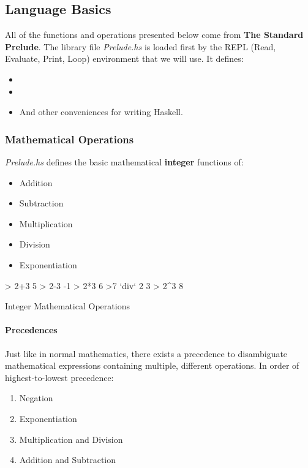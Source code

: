\subsection{Language Basics}\label{subsec:Lang_Basics}
All of the functions and operations presented below come from \textbf{The Standard Prelude}.
The library file \emph{Prelude.hs} is loaded first by the REPL (Read, Evaluate, Print, Loop) environment that we will use.
It defines:
\begin{itemize}[noitemsep]
\item {}
\item {}
\item And other conveniences for writing Haskell.
\end{itemize}

\subsubsection{Mathematical Operations}\label{subsubsec:Math_Ops}
\emph{Prelude.hs} defines the basic mathematical \textbf{integer} functions of:
\begin{itemize}[noitemsep]
\item Addition
\item Subtraction
\item Multiplication
\item Division
\item Exponentiation
\end{itemize}
\begin{listing}[h!tbp]
\begin{haskellsource}
> 2+3
5
> 2-3
-1
> 2*3
6
>7 `div` 2
3
> 2^3
8
\end{haskellsource}
\caption{Integer Mathematical Operations}
\label{lst:Int_Math_Ops}
\end{listing}

\paragraph{Precedences}\label{par:Math_Precedences}
Just like in normal mathematics, there exists a precedence to disambiguate mathematical expressions containing multiple, different operations.
In order of highest-to-lowest precedence:
\begin{enumerate}[noitemsep]
\item Negation
\item Exponentiation
\item Multiplication and Division
\item Addition and Subtraction
\end{enumerate}

